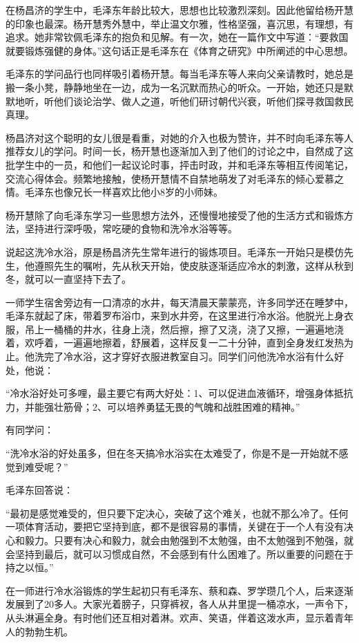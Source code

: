 \documentclass[../../dazhuan.tex]{subfiles}
\begin{document}
在杨昌济的学生中，毛泽东年龄比较大，思想也比较激烈深刻。因此他留给杨开慧的印象也最深。杨开慧秀外慧中，举止温文尔雅，性格坚强，喜沉思，有理想，有追求。她非常钦佩毛泽东的抱负和见解。有一次，她在一篇作文中写道：“要救国就要锻炼强健的身体。”这句话正是毛泽东在《体育之研究》中所阐述的中心思想。

毛泽东的学问品行也同样吸引着杨开慧。每当毛泽东等人来向父亲请教时，她总是搬一条小凳，静静地坐在一边，成为一名沉默而热心的听众。一开始，她还只是默默地听，听他们谈论治学、做人之道，听他们研讨朝代兴衰，听他们探寻救国救民真理。

    杨昌济对这个聪明的女儿很是看重，对她的介入也极为赞许，并不时向毛泽东等人推荐女儿的学问。时间一长，杨开慧也逐渐加入到了他们的讨论之中，自然成了这批学生中的一员，和他们一起议论时事，抨击时政，并和毛泽东等相互传阅笔记，交流心得体会。频繁地接触，使杨开慧情不自禁地萌发了对毛泽东的倾心爱慕之情。毛泽东也像兄长一样喜欢比他小8岁的小师妹。

杨开慧除了向毛泽东学习一些思想方法外，还慢慢地接受了他的生活方式和锻炼方法，坚持进行深呼吸，常吃硬的食物和洗冷水浴等等。

说起这洗冷水浴，原是杨昌济先生常年进行的锻炼项目。毛泽东一开始只是模仿先生，他遵照先生的嘱咐，先从秋天开始，使皮肤逐渐适应冷水的刺激，这样从秋到冬，就可以一直坚持下去了。

一师学生宿舍旁边有一口清凉的水井，每天清晨天蒙蒙亮，许多同学还在睡梦中，毛泽东就起了床，带着罗布浴巾，来到水井旁，在这里进行冷水浴。他脱光上身衣服，吊上一桶桶的井水，往身上浇，然后擦，擦了又浇，浇了又擦，一遍遍地浇着，欢呼着，一遍遍地擦着，舒展着，这样反复一二十分钟，直到全身发红发热为止。他洗完了冷水浴，这才穿好衣服进教室自习。同学们问他洗冷水浴有什么好处，他说：

“冷水浴好处可多哩，最主要它有两大好处：1、可以促进血液循环，增强身体抵抗力，并能强壮筋骨；2、可以培养勇猛无畏的气魄和战胜困难的精神。”

有同学问：

“洗冷水浴的好处虽多，但在冬天搞冷水浴实在太难受了，你是不是一开始就不感觉到难受呢？”

毛泽东回答说：

“最初是感觉难受的，但只要下定决心，突破了这个难关，也就不那么冷了。任何一项体育活动，要把它坚持到底，都不是很容易的事情，关键在于一个人有没有决心和毅力。只要有决心和毅力，就会由勉强到不太勉强，由不太勉强到不勉强，就会坚持到最后，就可以习惯成自然，不会感到有什么困难了。所以重要的问题在于持之以恒。”

在一师进行冷水浴锻炼的学生起初只有毛泽东、蔡和森、罗学瓒几个人，后来逐渐发展到了20多人。大家光着膀子，只穿裤衩，各人从井里提一桶凉水，一声令下，从头淋遍全身。有时他们还互相对着淋。欢声、笑语，伴着这泼水声，显示着青年人的勃勃生机。
\end{document}
